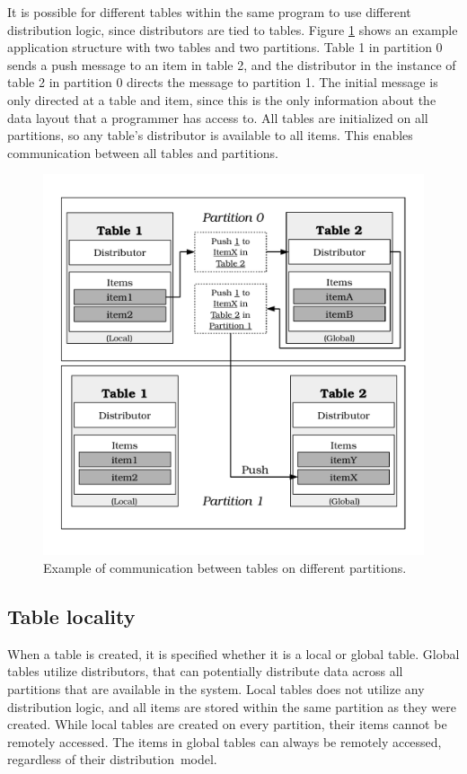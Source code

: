 \documentclass{uit-report}
\begin{document}
It is possible for different tables within the same program to use different distribution logic, since distributors are tied to tables. Figure \ref{fig:communication} shows an example application structure with two tables and two partitions. Table 1 in partition 0 sends a push message to an item in table 2, and the distributor in the instance of table 2 in partition 0 directs the message to partition 1. The initial message is only directed at a table and item, since this is the only information about the data layout that a programmer has access to. All tables are initialized on all partitions, so any table's distributor is available to all items. This enables communication between all tables and partitions.
\vspace{0.4cm}
\begin{figure}[H]
	\centering
	\includegraphics[width=13cm]{illustrations/communication.pdf}
	\caption{Example of communication between tables on different partitions.}
	\label{fig:communication}
\end{figure}

\subsection{Table locality}
When a table is created, it is specified whether it is a local or global table. Global tables utilize distributors, that can potentially distribute data across all partitions that are available in the system. Local tables does not utilize any distribution logic, and all items are stored within the same partition as they were created. While local tables are created on every partition, their items cannot be remotely accessed. The items in global tables can always be remotely accessed, regardless of their distribution~model.
\end{document}
